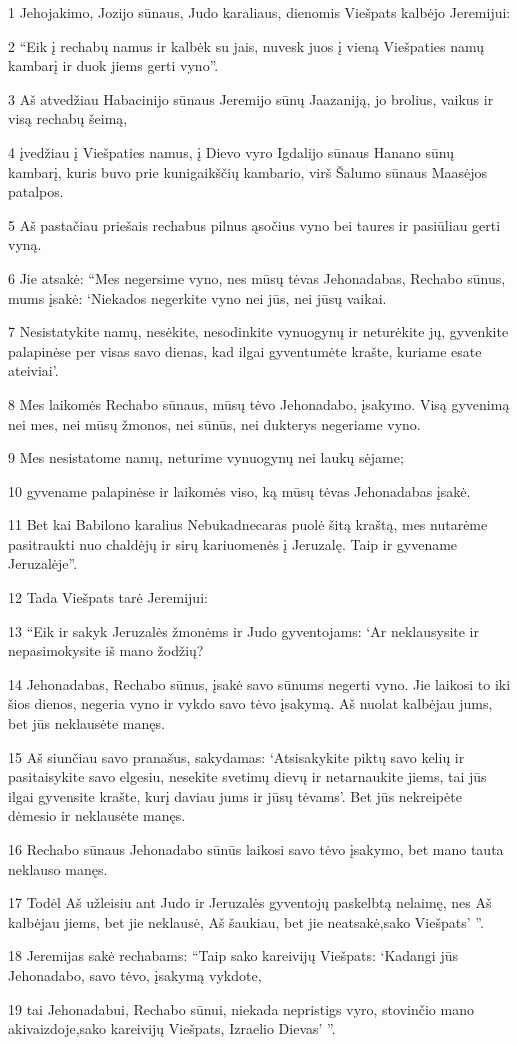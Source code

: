 \par 1 Jehojakimo, Jozijo sūnaus, Judo karaliaus, dienomis Viešpats kalbėjo Jeremijui: 
\par 2 “Eik į rechabų namus ir kalbėk su jais, nuvesk juos į vieną Viešpaties namų kambarį ir duok jiems gerti vyno”. 
\par 3 Aš atvedžiau Habacinijo sūnaus Jeremijo sūnų Jaazaniją, jo brolius, vaikus ir visą rechabų šeimą, 
\par 4 įvedžiau į Viešpaties namus, į Dievo vyro Igdalijo sūnaus Hanano sūnų kambarį, kuris buvo prie kunigaikščių kambario, virš Šalumo sūnaus Maasėjos patalpos. 
\par 5 Aš pastačiau priešais rechabus pilnus ąsočius vyno bei taures ir pasiūliau gerti vyną. 
\par 6 Jie atsakė: “Mes negersime vyno, nes mūsų tėvas Jehonadabas, Rechabo sūnus, mums įsakė: ‘Niekados negerkite vyno nei jūs, nei jūsų vaikai. 
\par 7 Nesistatykite namų, nesėkite, nesodinkite vynuogynų ir neturėkite jų, gyvenkite palapinėse per visas savo dienas, kad ilgai gyventumėte krašte, kuriame esate ateiviai’. 
\par 8 Mes laikomės Rechabo sūnaus, mūsų tėvo Jehonadabo, įsakymo. Visą gyvenimą nei mes, nei mūsų žmonos, nei sūnūs, nei dukterys negeriame vyno. 
\par 9 Mes nesistatome namų, neturime vynuogynų nei laukų sėjame; 
\par 10 gyvename palapinėse ir laikomės viso, ką mūsų tėvas Jehonadabas įsakė. 
\par 11 Bet kai Babilono karalius Nebukadnecaras puolė šitą kraštą, mes nutarėme pasitraukti nuo chaldėjų ir sirų kariuomenės į Jeruzalę. Taip ir gyvename Jeruzalėje”. 
\par 12 Tada Viešpats tarė Jeremijui: 
\par 13 “Eik ir sakyk Jeruzalės žmonėms ir Judo gyventojams: ‘Ar neklausysite ir nepasimokysite iš mano žodžių? 
\par 14 Jehonadabas, Rechabo sūnus, įsakė savo sūnums negerti vyno. Jie laikosi to iki šios dienos, negeria vyno ir vykdo savo tėvo įsakymą. Aš nuolat kalbėjau jums, bet jūs neklausėte manęs. 
\par 15 Aš siunčiau savo pranašus, sakydamas: ‘Atsisakykite piktų savo kelių ir pasitaisykite savo elgesiu, nesekite svetimų dievų ir netarnaukite jiems, tai jūs ilgai gyvensite krašte, kurį daviau jums ir jūsų tėvams’. Bet jūs nekreipėte dėmesio ir neklausėte manęs. 
\par 16 Rechabo sūnaus Jehonadabo sūnūs laikosi savo tėvo įsakymo, bet mano tauta neklauso manęs. 
\par 17 Todėl Aš užleisiu ant Judo ir Jeruzalės gyventojų paskelbtą nelaimę, nes Aš kalbėjau jiems, bet jie neklausė, Aš šaukiau, bet jie neatsakė,­sako Viešpats’ ”. 
\par 18 Jeremijas sakė rechabams: “Taip sako kareivijų Viešpats: ‘Kadangi jūs Jehonadabo, savo tėvo, įsakymą vykdote, 
\par 19 tai Jehonadabui, Rechabo sūnui, niekada nepristigs vyro, stovinčio mano akivaizdoje,­sako kareivijų Viešpats, Izraelio Dievas’ ”.



